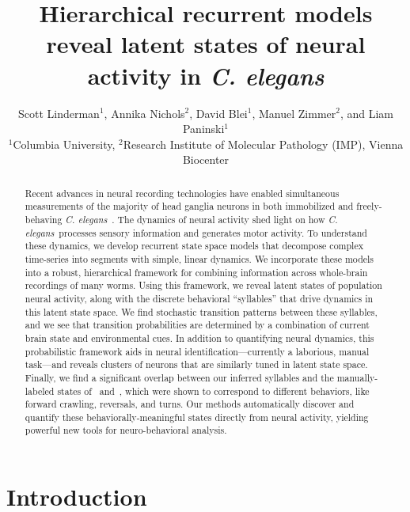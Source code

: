 \documentclass[11pt]{article}
\title{Hierarchical recurrent models reveal latent states of neural activity in \textit{C. elegans}}
\author{Scott Linderman$^{\text{1}}$,
  Annika Nichols$^{\text{2}}$,
  David Blei$^{\text{1}}$,
  Manuel Zimmer$^{\text{2}}$,
  and
  Liam Paninski$^{\text{1}}$
  \\
  $^{\text{1}}$Columbia University,
  $^{\text{2}}$Research Institute of Molecular Pathology (IMP), Vienna Biocenter
}
\newcommand{\celegans}{\textit{C. elegans}}
\begin{document}
\doublespacing

\maketitle

\begin{abstract}
  Recent advances in neural recording technologies have enabled
  simultaneous measurements of the majority of head ganglia neurons in
  both immobilized and freely-behaving
  \celegans~\citep{schrodel2013brain, prevedel2014simultaneous,
    nguyen2016whole}.  The dynamics of neural activity shed light on
  how \celegans~processes sensory information and generates motor
  activity.  To understand these dynamics, we develop recurrent state
  space models that decompose complex time-series into segments with
  simple, linear dynamics. We incorporate these models into a robust,
  hierarchical framework for combining information across whole-brain
  recordings of many worms.  Using this framework, we reveal latent
  states of population neural activity, along with the discrete
  behavioral ``syllables'' that drive dynamics in this latent state
  space.  We find stochastic transition patterns between these
  syllables, and we see that transition probabilities are determined
  by a combination of current brain state and environmental cues.  In
  addition to quantifying neural dynamics, this probabilistic
  framework aids in neural identification---currently a laborious,
  manual task---and reveals clusters of neurons that are similarly
  tuned in latent state space.  Finally, we find a significant overlap
  between our inferred syllables and the manually-labeled states
  of~\citet{kato2015global} and~\citet{nichols2017global}, which were
  shown to correspond to different behaviors, like forward crawling,
  reversals, and turns. Our methods automatically discover and
  quantify these behaviorally-meaningful states directly from neural
  activity, yielding powerful new tools for neuro-behavioral analysis.
\end{abstract}

\clearpage

\section*{Introduction}
\end{document}
